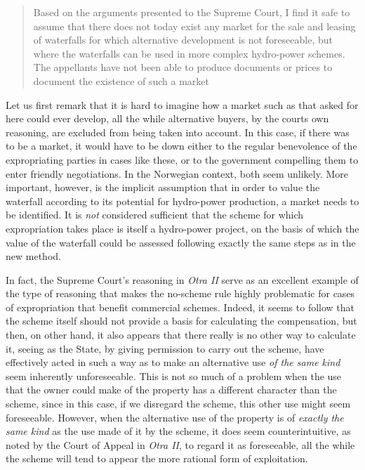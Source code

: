 \begin{quote}
Based on the arguments presented to the Supreme Court, I find it safe to assume that there does not today exist any market for the sale and leasing of waterfalls for which alternative development is not foreseeable, but where the waterfalls can be used in more complex hydro-power schemes. The appellants have not been able to produce documents or prices to document the existence of such a market
\end{quote}

Let us first remark that it is hard to imagine how a market such as that asked for here could ever develop, all the while alternative buyers, by the courts own reasoning, are excluded from being taken into account. In this case, if there was to be a market, it would have to be down either to the regular benevolence of the expropriating parties in cases like these, or to the government compelling them to enter friendly negotiations. In the Norwegian context, both seem unlikely. More important, however, is the implicit assumption that in order to value the waterfall according to its potential for hydro-power production, a market needs to be identified. It is \emph{not} considered sufficient that the scheme for which expropriation takes place is itself a hydro-power project, on the basis of which the value of the waterfall could be assessed following exactly the same steps as in the new method.

In fact, the Supreme Court's reasoning in \emph{Otra II} serve as an excellent example of the type of reasoning that makes the no-scheme rule highly problematic for cases of expropriation that benefit commercial schemes. Indeed, it seems to follow that the scheme itself should not provide a basis for calculating the compensation, but then, on other hand, it also appears that there really is no other way to calculate it, seeing as the State, by giving permission to carry out the scheme, have effectively acted in such a way as to make an alternative use \emph{of the same kind} seem inherently unforeseeable. This is not so much of a problem when the use that the owner could make of the property has a different character than the scheme, since in this case, if we disregard the scheme, this other use might seem foreseeable. However, when the alternative use of the property is of \emph{exactly the same kind} as the use made of it by the scheme, it does seem counterintuitive, as noted by the Court of Appeal in \emph{Otra II}, to regard it as foreseeable, all the while the scheme will tend to appear the more rational form of exploitation.

